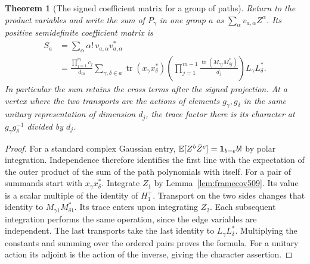 \documentclass[a4paper,11pt]{article}
\newtheorem{theorem}[proposition]{Theorem}
\theoremstyle{definition}
\theoremstyle{remark}
\numberwithin{equation}{section}
\begin{document}
\begin{theorem}[The signed coefficient matrix for a group of paths]\leavevmode
\label{thm:framepair509}
Return to the product variables and write the sum of \(P_\gamma\)
in one group \(a\) as \(\sum_\alpha v_{a,\alpha}Z^\alpha\).
Its positive semidefinite coefficient matrix is
\[
 \begin{aligned}
 S_a&=\sum_{\alpha}\alpha!\,v_{a,\alpha}v_{a,\alpha}^*\\
 &=\frac{\prod_{j=1}^m c_j}{d_m}
   \sum_{\gamma,\delta\in a}
       \operatorname{tr}(x_\gamma x_\delta^*)
       \left(\prod_{j=1}^{m-1}
          \frac{\operatorname{tr}(M_{\gamma j}M_{\delta j}^*)}{d_j}
       \right)L_\gamma L_\delta^* .
 \end{aligned}
\]
In particular the sum retains the cross terms after the signed
projection. At a vertex where the two transports are the actions
of elements \(g_\gamma,g_\delta\) in the same unitary
representation of dimension \(d_j\), the trace factor there is
its character at \(g_\gamma g_\delta^{-1}\) divided by \(d_j\).
\end{theorem}
\begin{proof}
For a standard complex Gaussian entry,
\(\mathbb E[Z^b\bar Z^e]={\bf1}_{b=e}b!\) by polar integration.
Independence therefore identifies the first line with the
expectation of the outer product of the sum of the path
polynomials with itself. For a pair of summands start with
\(x_\gamma x_\delta^*\). Integrate \(Z_1\) by
Lemma~\ref{lem:framecov509}. Its value is a scalar multiple
of the identity of \(H_1^+\). Transport on the two sides
changes that identity to \(M_{\gamma1}M_{\delta1}^*\). Its
trace enters upon integrating \(Z_2\). Each subsequent
integration performs the same operation, since the edge
variables are independent. The last transports take the last
identity to \(L_\gamma L_\delta^*\). Multiplying the constants
and summing over the ordered pairs proves the formula. For a
unitary action its adjoint is the action of the inverse, giving
the character assertion.
\end{proof}
\end{document}
